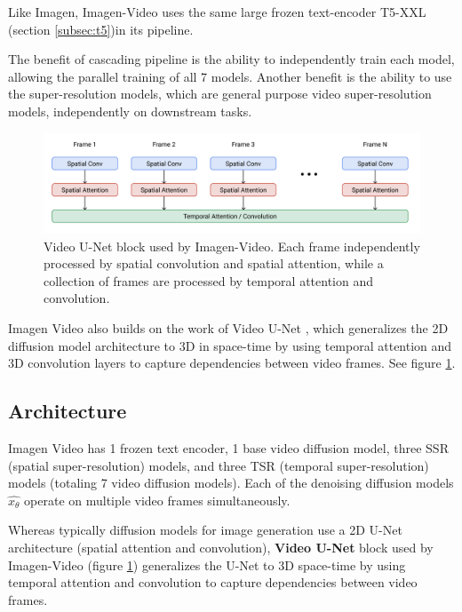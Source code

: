 Like Imagen, Imagen-Video uses the same large frozen text-encoder T5-XXL (section \ref{subsec:t5})in its pipeline.

The benefit of cascading pipeline is the ability to independently train each model, allowing the parallel training of all 7 models. Another benefit is the ability to use the super-resolution models, which are general purpose video super-resolution models, independently on downstream tasks.


\begin{figure}
    \centering
    \includegraphics[width=1\textwidth]{images/imagen_video/video_u_net.png}
    \caption{Video U-Net block \cite{video_diffusion_models} used by Imagen-Video. Each frame independently processed by spatial convolution and spatial attention, while a collection of frames are processed by temporal attention and convolution.}
    \label{fig:imagen_video_video_unet}
\end{figure}


Imagen Video also builds on the work of Video U-Net \cite{video_diffusion_models}, which generalizes the 2D diffusion model architecture to 3D in space-time by using temporal attention and 3D convolution layers to capture dependencies between video frames. See figure \ref{fig:imagen_video_video_unet}.









\subsection{Architecture}

Imagen Video has 1 frozen text encoder, 1 base video diffusion model, three SSR (spatial super-resolution) models, and three TSR (temporal super-resolution) models (totaling 7 video diffusion models). Each of the denoising diffusion models $\hat{x_\theta}$ operate on multiple video frames simultaneously.

Whereas typically diffusion models for image generation use a 2D U-Net architecture (spatial attention and convolution), \textbf{Video U-Net} block used by Imagen-Video (figure \ref{fig:imagen_video_video_unet}) generalizes the U-Net to 3D space-time by using temporal attention and convolution to capture dependencies between video frames.

